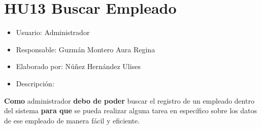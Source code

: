 \section{HU13 Buscar Empleado}
\begin{itemize}
	\item Usuario: Administrador
	\item Responsable: Guzmán Montero Aura Regina
	\item Elaborado por: Núñez Hernández Ulises
	\item Descripción:\\
\end{itemize}

\textbf{Como} administrador \textbf{debo de poder} buscar el registro de un empleado dentro del sistema \textbf{para que} se pueda realizar alguna tarea en específico sobre los datos de ese empleado de manera fácil y eficiente.